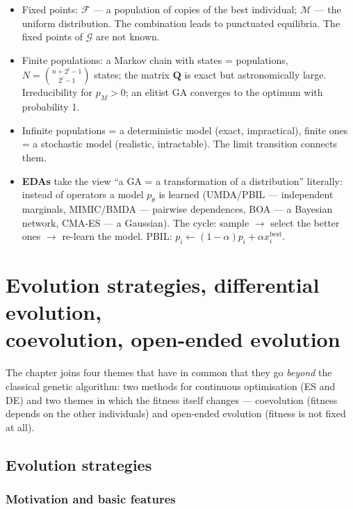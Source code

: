 \documentclass[11pt,a4paper]{article}
\theoremstyle{definition}
\providecommand{\uv}[1]{``#1''}
\begin{document}
\begin{itemize}
  $r(i,j,k) = r(i\oplus k, j \oplus k, 0)$ a single mixing matrix suffices.
\item Fixed points: $\mathcal{F}$ --- a population of copies of the best
  individual; $\mathcal{M}$ --- the uniform distribution. The combination leads
  to punctuated equilibria. The fixed points of $\mathcal{G}$ are not known.
\item Finite populations: a Markov chain with states = populations,
  $N = \binom{n+2^l-1}{2^l-1}$ states; the matrix $\mathbf{Q}$ is exact but
  astronomically large. Irreducibility for $p_M>0$; an elitist GA converges to
  the optimum with probability 1.
\item Infinite populations = a deterministic model (exact, impractical), finite
  ones = a stochastic model (realistic, intractable). The limit transition
  connects them.
\item \textbf{EDAs} take the view \uv{a GA = a transformation of a
  distribution} literally: instead of operators a model $p_\theta$ is learned
  (UMDA/PBIL --- independent marginals, MIMIC/BMDA --- pairwise dependences,
  BOA --- a Bayesian network, CMA-ES --- a Gaussian). The cycle: sample $\to$
  select the better ones $\to$ re-learn the model. PBIL:
  $p_i \gets (1-\alpha)p_i + \alpha x_i^{\mathrm{best}}$.
\end{itemize}

\section[Evolution strategies, differential evolution, coevolution, open-ended evolution]%
{Evolution strategies, differential evolution,\protect\\
coevolution, open-ended evolution}
\label{sec:es}

The chapter joins four themes that have in common that they go \emph{beyond} the classical
genetic algorithm: two methods for continuous optimisation (ES and DE) and two themes in
which the fitness itself changes --- coevolution (fitness depends on the other individuals)
and open-ended evolution (fitness is not fixed at all).

\subsection{Evolution strategies}
\label{ssec:es}
\subsubsection{Motivation and basic features}
\end{document}
